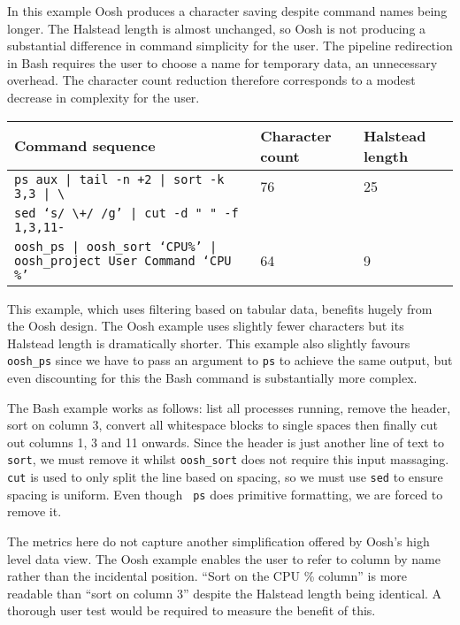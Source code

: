 \documentclass[12pt,twoside,notitlepage]{report}
\begin{document}
In this example Oosh produces a character saving despite command names being
longer. The Halstead length is almost unchanged, so Oosh is not producing a
substantial difference in command simplicity for the user. The pipeline
redirection in Bash requires the user to choose a name for temporary data, an
unnecessary overhead. The character count reduction therefore corresponds to a
modest decrease in complexity for the user.

\begin{tabular}{|l|l|l|}
\hline
Command sequence & Character count & Halstead length \\
\hline
{\tt ps aux | tail -n +2 | sort -k 3,3 | \textbackslash} & 76 & 25\\
{\tt sed `s/ \textbackslash+/ /g' | cut -d " " -f 1,3,11-} & & \\
\hline
{\tt oosh\_ps | oosh\_sort `CPU\%' | oosh\_project User Command `CPU \%'} & 64 &
9 \\
\hline
\end{tabular}

This example, which uses filtering based on tabular data, benefits hugely from
the Oosh design. The Oosh example uses slightly fewer characters but its
Halstead length is dramatically shorter. This example also slightly favours {\tt
  oosh\_ps} since we have to pass an argument to {\tt ps} to achieve the same
output, but even discounting for this the Bash command is substantially more complex.

The Bash example works as follows: list all processes running, remove the
header, sort on column 3, convert all whitespace blocks to single spaces then
finally cut out columns 1, 3 and 11 onwards. Since the header is just another
line of text to {\tt sort}, we must remove it whilst {\tt oosh\_sort} does not
require this input massaging. {\tt cut} is used to only split the line based on
spacing, so we must use {\tt sed} to ensure spacing is uniform. Even though {\tt
  ps} does primitive formatting, we are forced to remove it.

The metrics here do not capture another simplification offered by Oosh's high
level data view. The Oosh example enables the user to refer to column by name
rather than the incidental position. ``Sort on the CPU \% column'' is more
readable than ``sort on column 3'' despite the Halstead length being
identical. A thorough user test would be required to measure the benefit of
this.

\end{document}
